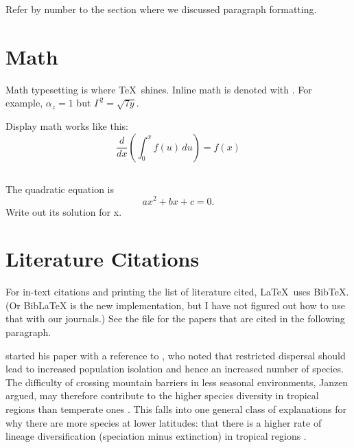 \documentclass{article}
\begin{document}
Refer by number to the section where we discussed paragraph formatting.

\section{Math}
\label{sec:math}

Math typesetting is where \TeX\ shines.
Inline math is denoted with \latexcode{\$}.
For example, $\alpha_z = 1$ but $\Gamma^2 = \sqrt{7 y}$.

Display math works like this:
\begin{equation}
    \frac{d}{dx} \left( \int_{0}^{x} f(u)\, du \right) = f(x)
\label{eq:deriv}
\end{equation}


\subsection*{\task}

The quadratic equation is
\begin{equation}
    a x^2 + b x + c = 0.
\label{eq:quadratic}
\end{equation}
Write out its solution for x.

\section{Literature Citations}
\label{sec:literature}

For in-text citations and printing the list of literature cited, \LaTeX\ uses BibTeX.
(Or BibLaTeX is the new implementation, but I have not figured out how to use that with our journals.)
See the  file for the papers that are cited in the following paragraph.

\citet{Janzen1967} started his paper with a reference to \citet{Simpson1964}, who noted that restricted dispersal should lead to increased population isolation and hence an increased number of species.
The difficulty of crossing mountain barriers in less seasonal environments, Janzen argued, may therefore contribute to the higher species diversity in tropical regions than temperate ones \citep{Ghalambor2006}.
This falls into one general class of explanations for why there are more species at lower latitudes: that there is a higher rate of lineage diversification (speciation minus extinction) in tropical regions               \citep{Ricklefs2006, Weir2007, Mittelbach2007}.
\end{document}
